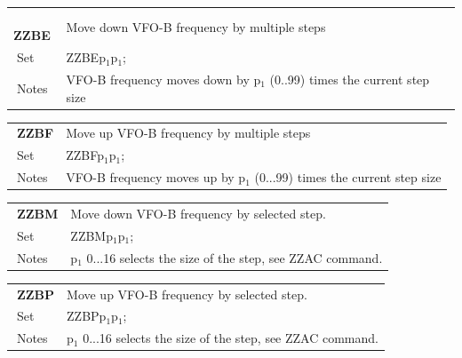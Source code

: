 \documentclass[12pt]{book}
\begin{document}
\begin{center}
\begin{tabular}{|p{2cm}|p{11cm}|}
\toprule
$\phantom{\Big|}$\textbf{\large ZZBE} & Move down VFO-B frequency by multiple steps \\\cline{1-2}
$\phantom{\Big|}${\large Set} & {ZZBEp$_1$p$_1$;} \\\hline
$\phantom{\Big|}${\large Notes} & \multicolumn{1}{|p{11cm}|}{VFO-B frequency moves down by p$_1$ (0..99) times the current step size} \\
\bottomrule
\end{tabular}
\end{center}

\begin{center}
\begin{tabular}{|p{2cm}|p{11cm}|}
\toprule
$\phantom{\Big|}$\textbf{\large ZZBF} & Move up VFO-B frequency by multiple steps \\\cline{1-2}
$\phantom{\Big|}${\large Set} & {ZZBFp$_1$p$_1$;} \\\hline
$\phantom{\Big|}${\large Notes} & \multicolumn{1}{|p{11cm}|}{VFO-B frequency moves up by p$_1$ (0...99) times the current step size} \\
\bottomrule
\end{tabular}
\end{center}

\begin{center}
\begin{tabular}{|p{2cm}|p{11cm}|}
\toprule
$\phantom{\Big|}$\textbf{\large ZZBM} & Move down VFO-B frequency by selected step. \\\cline{1-2}
$\phantom{\Big|}${\large Set} & {ZZBMp$_1$p$_1$;} \\\hline
$\phantom{\Big|}${\large Notes} & \multicolumn{1}{|p{11cm}|}{p$_1$ 0...16 selects the size of the step, see ZZAC command.} \\
\bottomrule
\end{tabular}
\end{center}

\begin{center}
\begin{tabular}{|p{2cm}|p{11cm}|}
\toprule
$\phantom{\Big|}$\textbf{\large ZZBP} & Move up VFO-B frequency by selected step. \\\cline{1-2}
$\phantom{\Big|}${\large Set} & {ZZBPp$_1$p$_1$;} \\\hline
$\phantom{\Big|}${\large Notes} & \multicolumn{1}{|p{11cm}|}{p$_1$ 0...16 selects the size of the step, see ZZAC command.} \\
\bottomrule
\end{tabular}
\end{center}
\end{document}
